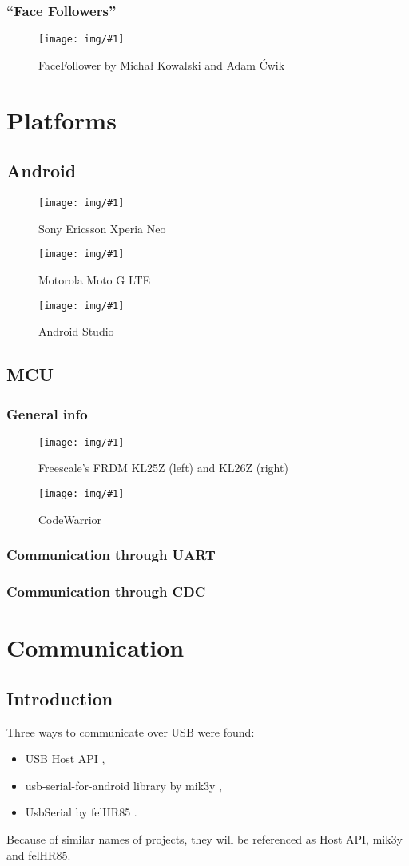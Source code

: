 \documentclass[openany]{mgr} %
\newcommand{\includeimage}[2]{
	\begin{figure}
		\centering
		\texttt{[image: img/\#1]}
		\caption{#2}
		\label{img:#1}
	\end{figure}
}
\begin{document}
\subsection{``Face Followers''}

\includeimage{SoA0}{FaceFollower by Michał Kowalski and Adam Ćwik}

\chapter{Platforms}

\section{Android}
\includeimage{xperianeo}{Sony Ericsson Xperia Neo}
\includeimage{motog}{Motorola Moto G LTE}
\includeimage{androidstudio}{Android Studio}

\section{MCU}
\subsection{General info}
\includeimage{MCUs}{Freescale's FRDM KL25Z (left) and KL26Z (right)}
\includeimage{codewarrior}{CodeWarrior}

\subsection{Communication through UART}
\subsection{Communication through CDC}

\chapter{Communication}

\section{Introduction}
Three ways to communicate over USB were found:
\begin{itemize}
  \item USB Host API \cite{android_reference},
  \item usb-serial-for-android library by mik3y \cite{mik3y},
  \item UsbSerial by felHR85 \cite{felHR85}.
\end{itemize}
Because of similar names of projects, they will be referenced as Host API, mik3y
and felHR85.
\end{document}
